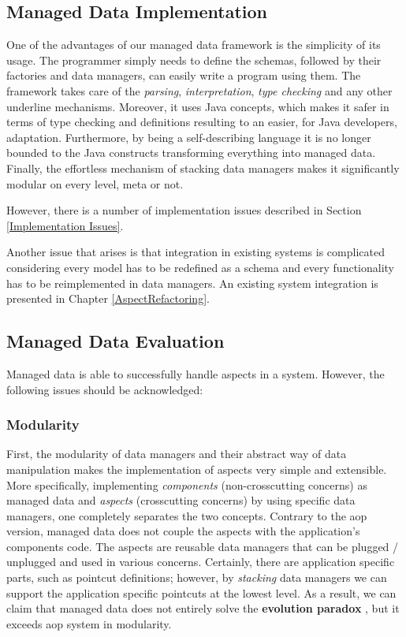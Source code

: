 \subsection{Managed Data Implementation}
One of the advantages of our managed data framework is the simplicity of its usage. 
The programmer simply needs to define the schemas, followed by their factories and data managers, can easily write a program using them.
The framework takes care of the \textit{parsing}, \textit{interpretation}, \textit{type checking} and any other underline mechanisms.
Moreover, it uses Java concepts, which makes it safer in terms of type checking and definitions resulting to an easier, for Java developers, adaptation.
Furthermore, by being a self-describing language it is no longer bounded to the Java constructs transforming everything into managed data.
Finally, the effortless mechanism of stacking data managers makes it significantly modular on every level, meta or not.

However, there is a number of implementation issues described in Section \ref{Implementation Issues}.

Another issue that arises is that integration in existing systems is complicated considering every model has to be redefined as a schema and every functionality has to be reimplemented in data managers.
An existing system integration is presented in Chapter \ref{AspectRefactoring}.

\subsection{Managed Data Evaluation}
Managed data is able to successfully handle aspects in a system.
However, the following issues should be acknowledged:

\subsubsection{Modularity}
First, the modularity of data managers and their abstract way of data manipulation makes the implementation of aspects very simple and extensible.
More specifically, implementing \textit{components} (non-crosscutting concerns) as managed data and \textit{aspects} (crosscutting concerns) by using specific data managers, one completely separates the two concepts.
Contrary to the \ac{aop} version, managed data does not couple the aspects with the application's components code.
The aspects are reusable data managers that can be plugged / unplugged and used in various concerns.
Certainly, there are application specific parts, such as pointcut definitions; however, by \textit{stacking} data managers we can support the application specific pointcuts at the lowest level.
As a result, we can claim that managed data does not entirely solve the \textbf{evolution paradox} \cite{tourwe2003existence}, but it exceeds \ac{aop} system in modularity.

